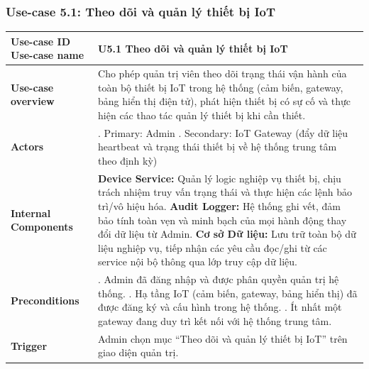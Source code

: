 
\subsubsection{Use-case 5.1: Theo dõi và quản lý thiết bị IoT}
\vspace{0.5cm}
\noindent
{\small
\renewcommand{\arraystretch}{0.95}
\begin{longtable}{|>{\raggedright\arraybackslash}p{4cm}|>{\raggedright\arraybackslash}p{11.5cm}|}
\hline
\textbf{Use-case ID} \newline \textbf{Use-case name} & U5.1 \newline \textbf{Theo dõi và quản lý thiết bị IoT} \\ \hline
\endhead
\textbf{Use-case overview} & Cho phép quản trị viên theo dõi trạng thái vận hành của toàn bộ thiết bị IoT trong hệ thống (cảm biến, gateway, bảng hiển thị điện tử), phát hiện thiết bị có sự cố và thực hiện các thao tác quản lý thiết bị khi cần thiết. \\ \hline
\textbf{Actors} & 1. Primary: Admin \newline 2. Secondary: IoT Gateway (đẩy dữ liệu heartbeat và trạng thái thiết bị về hệ thống trung tâm theo định kỳ) \\ \hline
\textbf{Internal Components} &
\textbf{Device Service:} Quản lý logic nghiệp vụ thiết bị, chịu trách nhiệm truy vấn trạng thái và thực hiện các lệnh bảo trì/vô hiệu hóa. \newline
\textbf{Audit Logger:} Hệ thống ghi vết, đảm bảo tính toàn vẹn và minh bạch của mọi hành động thay đổi dữ liệu từ Admin. \newline
\textbf{Cơ sở Dữ liệu:} Lưu trữ toàn bộ dữ liệu nghiệp vụ, tiếp nhận các yêu cầu đọc/ghi từ các service nội bộ thông qua lớp truy cập dữ liệu. \\ \hline
\textbf{Preconditions} &
1. Admin đã đăng nhập và được phân quyền quản trị hệ thống. \newline
2. Hạ tầng IoT (cảm biến, gateway, bảng hiển thị) đã được đăng ký và cấu hình trong hệ thống. \newline
3. Ít nhất một gateway đang duy trì kết nối với hệ thống trung tâm. \\ \hline
\textbf{Trigger} & Admin chọn mục ``Theo dõi và quản lý thiết bị IoT'' trên giao diện quản trị. \\ \hline

\end{longtable}}
